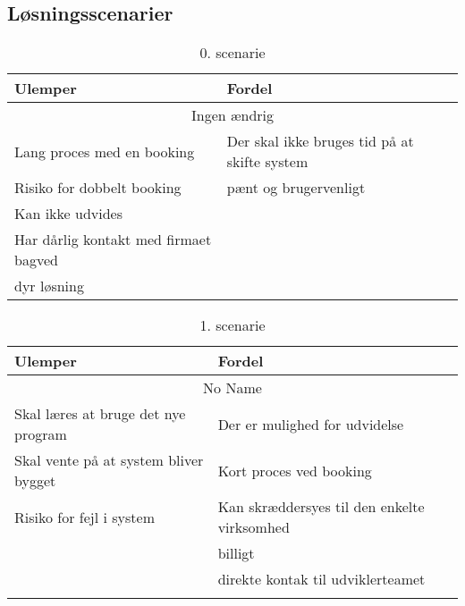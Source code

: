 \subsection{Løsningsscenarier}


\begin{table}[H]
\caption{0. scenarie}
\label{0scenarie}
\begin{tabular}{|l|l|}
\hline
Ulemper                               & \cellcolor[HTML]{C0C0C0}Fordel                                       \\ \hline
\multicolumn{2}{|c|}{Ingen ændrig}                                                                           \\ \hline
Lang proces med en booking            & \cellcolor[HTML]{C0C0C0}Der skal ikke bruges tid på at skifte system \\ \hline
Risiko for dobbelt booking            & \cellcolor[HTML]{C0C0C0}pænt og brugervenligt                        \\ \hline
Kan ikke udvides                      & \cellcolor[HTML]{C0C0C0}                                             \\ \hline
Har dårlig kontakt med firmaet bagved & \cellcolor[HTML]{C0C0C0}                                             \\ \hline
dyr løsning                           & \cellcolor[HTML]{C0C0C0}                                             \\ \hline
\end{tabular}
\end{table}


\begin{table}[H]
\caption{1. scenarie}
\label{1scenarie}
\begin{tabular}{|l|l|}
\hline
Ulemper                               & \cellcolor[HTML]{C0C0C0}Fordel                                               \\ \hline
\multicolumn{2}{|c|}{No Name}                                                                                        \\ \hline
Skal læres at bruge det nye program   & \cellcolor[HTML]{C0C0C0}Der er mulighed for udvidelse                        \\ \hline
Skal vente på at system bliver bygget & \cellcolor[HTML]{C0C0C0}Kort proces ved booking                              \\ \hline
Risiko for fejl i system              & \cellcolor[HTML]{C0C0C0}Kan skræddersyes til den enkelte virksomhed          \\ \hline
                                      & \cellcolor[HTML]{C0C0C0}billigt                                              \\ \hline
                                      & \cellcolor[HTML]{C0C0C0}direkte kontak til udviklerteamet                    \\ \hline
                                      & \cellcolor[HTML]{C0C0C0}{\color[HTML]{333333} Brugervenligt og overskueligt} \\ \hline
\end{tabular}
\end{table}

